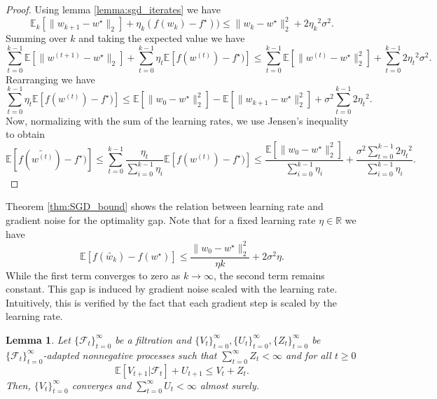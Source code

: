 \documentclass[12pt]{article}
\newtheorem{lemma}[lemma]{Lemma}
\theoremstyle{definition}
\numberwithin{equation}{section}
\newcommand{\R}{\mathbb{R}}
\newcommand{\E}{\mathbb{E}}
\newcommand{\CF}{\mathcal{F}}
\newcommand{\ev}[1]{\mathbb{E}\left[{#1}\right]}
\newcommand{\norm}[1]{\lVert{#1}\rVert_2}
\begin{document}
\begin{proof}
  Using lemma \ref{lemma:sgd_iterates} we have
  \begin{equation*}
    \E_k[\norm{w_{k+1} - w^\star}] + \eta_k (f(w_{k}) - f^\star)) \leq \norm{w_{k} - w^\star}^2 + 2{\eta_k}^2\sigma^2.
  \end{equation*}
  Summing over $k$ and taking the expected value we have
  \begin{equation*}
    \sum_{t=0}^{k-1}\ev{\norm{w^{(t+1)} - w^\star}} + \sum_{t=0}^{k-1} \eta_t \ev{f(w^{(t)}) - f^\star)} \leq \sum_{t=0}^{k-1} \ev{\norm{w^{(t)} - w^\star}^2} + \sum_{t=0}^{k-1} 2{\eta_t}^2\sigma^2.
  \end{equation*}
  Rearranging we have
  \begin{equation*}
    \sum_{t=0}^{k-1} \eta_t \ev{f(w^{(t)}) - f^\star)} \leq \ev{\norm{w_{0} - w^\star}^2} - \ev{\norm{w_{k+1} - w^\star}^2} + \sigma^2\sum_{t=0}^{k-1} 2{\eta_t}^2.
  \end{equation*}
  Now, normalizing with the sum of the learning rates, we use Jensen's inequality to obtain
  \begin{equation*}
    \ev{f(\widetilde{w^{(t)}}) - f^\star)} \leq \sum_{t=0}^{k-1} \frac{\eta_t}{\sum_{i=0}^{k-1}\eta_i} \ev{f(w^{(t)}) - f^\star)} \leq \frac{\ev{\norm{w_{0} - w^\star}^2}}{\sum_{i=0}^{k-1}\eta_i} + \frac{\sigma^2\sum_{t=0}^{k-1} 2{\eta_t}^2}{\sum_{i=0}^{k-1}\eta_i}.
  \end{equation*}
\end{proof}

Theorem \ref{thm:SGD_bound} shows the relation between learning rate and gradient noise for the optimality gap. Note that for a fixed learning rate $\eta \in \R$ we have
\begin{equation*}
  \E [f(\widetilde{w_{k}}) - f(w^\star)] \leq \frac{\norm{w_{0} - w^\star}^2}{\eta k} + 2 \sigma^2 \eta.
\end{equation*}
While the first term converges to zero as $k \rightarrow \infty$, the second term remains constant. This gap is induced by gradient noise scaled with the learning rate. Intuitively, this is verified by the fact that each gradient step is scaled by the learning rate.
\begin{lemma}
  Let $\{\CF_t\}_{t=0}^\infty$ be a filtration and $\{V_t\}_{t=0}^\infty, \{U_t\}_{t=0}^\infty, \{Z_t\}_{t=0}^\infty$ be $\{\CF_t\}_{t=0}^\infty$-adapted nonnegative processes such that $\sum_{t=0}^\infty Z_t < \infty$ and for all $t \geq 0$
  \begin{equation*}
    \ev{V_{t+1}|\CF_t} + U_{t+1} \leq V_t + Z_t.
  \end{equation*}
  Then, $\{V_t\}_{t=0}^\infty$ converges and $\sum_{t=0}^\infty U_t < \infty$ almost surely.
\end{lemma}
\end{document}
